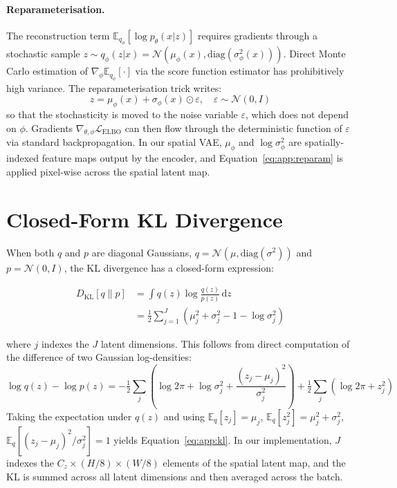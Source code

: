 \documentclass[12pt, a4paper, twoside, openright]{book}
\begin{document}
\begin{appendices}
\paragraph{Reparameterisation.}
The reconstruction term $\mathbb{E}_{q_\phi}[\log p_\theta(x|z)]$ requires gradients through a stochastic sample $z \sim q_\phi(z|x) = \mathcal{N}(\mu_\phi(x), \mathrm{diag}(\sigma^2_\phi(x)))$. Direct Monte Carlo estimation of $\nabla_\phi \mathbb{E}_{q_\phi}[\cdot]$ via the score function estimator has prohibitively high variance. The reparameterisation trick writes:
\begin{equation}
z = \mu_\phi(x) + \sigma_\phi(x) \odot \varepsilon, \quad \varepsilon \sim \mathcal{N}(0, I)
\label{eq:app:reparam}
\end{equation}
so that the stochasticity is moved to the noise variable $\varepsilon$, which does not depend on $\phi$. Gradients $\nabla_{\theta,\phi} \mathcal{L}_{\mathrm{ELBO}}$ can then flow through the deterministic function of $\varepsilon$ via standard backpropagation. In our spatial VAE, $\mu_\phi$ and $\log \sigma^2_\phi$ are spatially-indexed feature maps output by the encoder, and Equation~\eqref{eq:app:reparam} is applied pixel-wise across the spatial latent map.

\section{Closed-Form KL Divergence}
\label{app:maths:kl}

When both $q$ and $p$ are diagonal Gaussians, $q = \mathcal{N}(\mu, \mathrm{diag}(\sigma^2))$ and $p = \mathcal{N}(0, I)$, the KL divergence has a closed-form expression:

\begin{align}
D_{\mathrm{KL}}[q \| p]
&= \int q(z) \log \frac{q(z)}{p(z)} \, \mathrm{d}z \nonumber \\
&= \frac{1}{2} \sum_{j=1}^{J} \left(
    \mu_j^2 + \sigma_j^2 - 1 - \log \sigma_j^2
   \right)
\label{eq:app:kl}
\end{align}

where $j$ indexes the $J$ latent dimensions. This follows from direct computation of the difference of two Gaussian log-densities:
\begin{equation}
\log q(z) - \log p(z)
= -\tfrac{1}{2}\textstyle\sum_j \left(\log 2\pi + \log \sigma_j^2 + \frac{(z_j - \mu_j)^2}{\sigma_j^2}\right)
+ \tfrac{1}{2}\textstyle\sum_j \left(\log 2\pi + z_j^2\right)
\end{equation}
Taking the expectation under $q(z)$ and using $\mathbb{E}_q[z_j] = \mu_j$, $\mathbb{E}_q[z_j^2] = \mu_j^2 + \sigma_j^2$, $\mathbb{E}_q[(z_j - \mu_j)^2/\sigma_j^2] = 1$ yields Equation~\eqref{eq:app:kl}. In our implementation, $J$ indexes the $C_z \times (H/8) \times (W/8)$ elements of the spatial latent map, and the KL is summed across all latent dimensions and then averaged across the batch.


\end{appendices}
\end{document}
